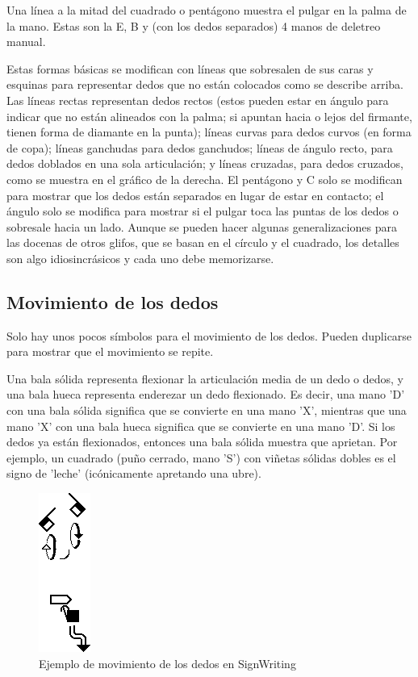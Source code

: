 Una línea a la mitad del cuadrado o pentágono muestra el pulgar en la palma de la mano. Estas son la E, B y (con los dedos separados) 4 manos de deletreo manual.

Estas formas básicas se modifican con líneas que sobresalen de sus caras y esquinas para representar dedos que no están colocados como se describe arriba. Las líneas rectas representan dedos rectos (estos pueden estar en ángulo para indicar que no están alineados con la palma; si apuntan hacia o lejos del firmante, tienen forma de diamante en la punta); líneas curvas para dedos curvos (en forma de copa); líneas ganchudas para dedos ganchudos; líneas de ángulo recto, para dedos doblados en una sola articulación; y líneas cruzadas, para dedos cruzados, como se muestra en el gráfico de la derecha. El pentágono y C solo se modifican para mostrar que los dedos están separados en lugar de estar en contacto; el ángulo solo se modifica para mostrar si el pulgar toca las puntas de los dedos o sobresale hacia un lado. Aunque se pueden hacer algunas generalizaciones para las docenas de otros glifos, que se basan en el círculo y el cuadrado, los detalles son algo idiosincrásicos y cada uno debe memorizarse.

\subsection{Movimiento de los dedos}\label{subsection:state-of-the-art:sl:finger_movement}
Solo hay unos pocos símbolos para el movimiento de los dedos. Pueden duplicarse para mostrar que el movimiento se repite.

Una bala sólida representa flexionar la articulación media de un dedo o dedos, y una bala hueca representa enderezar un dedo flexionado. Es decir, una mano 'D' con una bala sólida significa que se convierte en una mano 'X', mientras que una mano 'X' con una bala hueca significa que se convierte en una mano 'D'. Si los dedos ya están flexionados, entonces una bala sólida muestra que aprietan. Por ejemplo, un cuadrado (puño cerrado, mano 'S') con viñetas sólidas dobles es el signo de 'leche' (icónicamente apretando una ubre).

\begin{figure}[ht!]
    \centering
    \includegraphics[scale=0.5]{Graphics/finger_movement.png}
    \caption{Ejemplo de movimiento de los dedos en SignWriting}
    \label{fig:finger_movement}
\end{figure}

